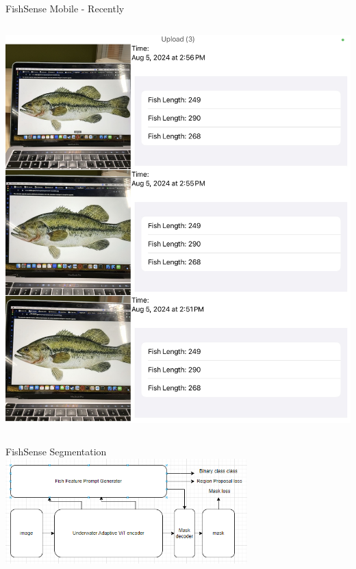 \begin{frame}{FishSense Mobile - Recently}
\begin{columns}
\begin{column}{0.3\textwidth}
            \includegraphics[height=1.3\textheight,width=1.3\textwidth,keepaspectratio]{images/FailedImageGallery.png}
        \end{column}
    \end{columns}
\end{frame}

\begin{frame}{FishSense Segmentation}
    \centering
    \includegraphics[height=0.7\textheight,width=0.7\textwidth,keepaspectratio]{images/fs_seg_pipeline1.png}

\end{frame}

